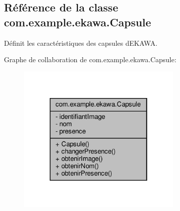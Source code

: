 \hypertarget{classcom_1_1example_1_1ekawa_1_1_capsule}{}\subsection{Référence de la classe com.\+example.\+ekawa.\+Capsule}
\label{classcom_1_1example_1_1ekawa_1_1_capsule}


Définit les caractéristiques des capsules d\textquotesingle{}E\+K\+A\+WA.  




Graphe de collaboration de com.\+example.\+ekawa.\+Capsule\+:\nopagebreak
\begin{figure}[H]
\begin{center}
\leavevmode
\includegraphics[width=226pt]{classcom_1_1example_1_1ekawa_1_1_capsule__coll__graph}
\end{center}
\end{figure}
